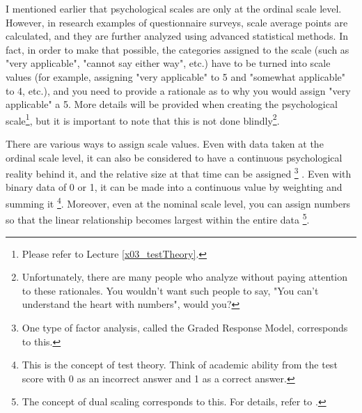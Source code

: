 \documentclass{ltjsbook}
\begin{document}
I mentioned earlier that psychological scales are only at the ordinal scale level. However, in research examples of questionnaire surveys, scale average points are calculated, and they are further analyzed using advanced statistical methods. In fact, in order to make that possible, the categories assigned to the scale (such as "very applicable", "cannot say either way", etc.) have to be turned into scale values ​​(for example, assigning "very applicable" to 5 and "somewhat applicable" to 4, etc.), and you need to provide a rationale as to why you would assign "very applicable" a 5. More details will be provided when creating the psychological scale\footnote{Please refer to Lecture \ref{x03_testTheory}.}, but it is important to note that this is not done blindly\footnote{Unfortunately, there are many people who analyze without paying attention to these rationales. You wouldn't want such people to say, "You can't understand the heart with numbers", would you?}.

There are various ways to assign scale values. Even with data taken at the ordinal scale level, it can also be considered to have a continuous psychological reality behind it, and the relative size at that time can be assigned \footnote{One type of factor analysis, called the Graded Response Model, corresponds to this.} . Even with binary data of 0 or 1, it can be made into a continuous value by weighting and summing it \footnote{This is the concept of test theory. Think of academic ability from the test score with 0 as an incorrect answer and 1 as a correct answer.}. Moreover, even at the nominal scale level, you can assign numbers so that the linear relationship becomes largest within the entire data \footnote{The concept of dual scaling corresponds to this. For details, refer to \textcite{Nishisato2010}.}.
\end{document}
